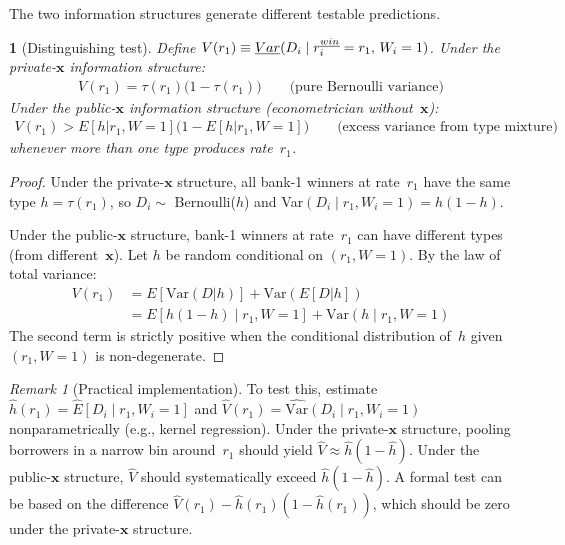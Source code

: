 \documentclass[12pt]{article}
\theoremstyle{plain}
\theoremstyle{plain}
\newtheorem{prop}[thm]{\protect\propositionname}
\theoremstyle{definition}
\theoremstyle{remark}
\newtheorem{remark}[thm]{Remark}
\providecommand{\propositionname}{Proposition}
\begin{document}
The two information structures generate different testable predictions.

\begin{prop}[Distinguishing test]\label{prop:test8}
Define $V(r_1) \equiv \emph{Var}(D_i \mid r_i^{\emph{win}} = r_1,\, W_i = 1)$.  Under the private-$\mathbf{x}$ information structure:
\begin{align*}
    V(r_1) = \tau(r_1)\big(1 - \tau(r_1)\big) \qquad \text{(pure Bernoulli variance)}
\end{align*}
Under the public-$\mathbf{x}$ information structure (econometrician without~$\mathbf{x}$):
\begin{align*}
    V(r_1) > E[h|r_1, W\!=\!1]\big(1 - E[h|r_1, W\!=\!1]\big) \qquad \text{(excess variance from type mixture)}
\end{align*}
whenever more than one type produces rate~$r_1$.
\end{prop}

\begin{proof}
Under the private-$\mathbf{x}$ structure, all bank-1 winners at rate~$r_1$ have the same type $h = \tau(r_1)$, so $D_i \sim$ Bernoulli($h$) and Var$(D_i \mid r_1, W_i\!=\!1) = h(1-h)$.

Under the public-$\mathbf{x}$ structure, bank-1 winners at rate~$r_1$ can have different types (from different~$\mathbf{x}$).  Let $h$ be random conditional on $(r_1, W\!=\!1)$.  By the law of total variance:
\begin{align*}
    V(r_1) &= E[\text{Var}(D|h)] + \text{Var}(E[D|h]) \\
    &= E[h(1-h) \mid r_1, W\!=\!1] + \text{Var}(h \mid r_1, W\!=\!1)
\end{align*}
The second term is strictly positive when the conditional distribution of~$h$ given $(r_1, W\!=\!1)$ is non-degenerate.
\end{proof}

\begin{remark}[Practical implementation]
To test this, estimate $\hat{h}(r_1) = \hat{E}[D_i \mid r_1, W_i\!=\!1]$ and $\hat{V}(r_1) = \widehat{\text{Var}}(D_i \mid r_1, W_i\!=\!1)$ nonparametrically (e.g., kernel regression).  Under the private-$\mathbf{x}$ structure, pooling borrowers in a narrow bin around~$r_1$ should yield $\hat{V} \approx \hat{h}(1-\hat{h})$.  Under the public-$\mathbf{x}$ structure, $\hat{V}$ should systematically exceed $\hat{h}(1-\hat{h})$.  A formal test can be based on the difference $\hat{V}(r_1) - \hat{h}(r_1)(1-\hat{h}(r_1))$, which should be zero under the private-$\mathbf{x}$ structure.
\end{remark}
\end{document}
